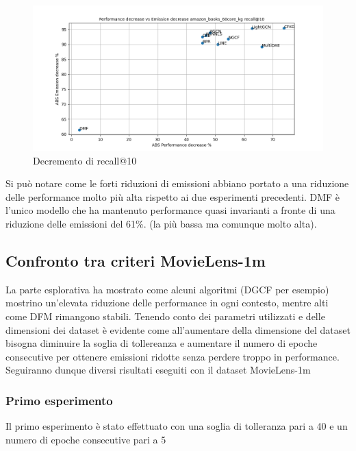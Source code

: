 \begin{figure}[H]
    \centering
    \includegraphics[scale=0.5]{images/decrement_recall@10_amazon_books_60core_kg.png}
    \caption{Decremento di recall@10}
\end{figure}
\noindent Si può notare come le forti riduzioni di emissioni abbiano portato a una riduzione delle performance molto più alta rispetto ai due esperimenti precedenti.
DMF è l'unico modello che ha mantenuto performance quasi invarianti a fronte di una riduzione delle emissioni del 61\%. (la più bassa ma comunque molto alta).
    

\subsection{Confronto tra criteri MovieLens-1m}
La parte esplorativa ha mostrato come alcuni algoritmi (DGCF per esempio) mostrino un'elevata riduzione delle performance in ogni contesto, mentre alti come DFM rimangono stabili.
Tenendo conto dei parametri utilizzati e delle dimensioni dei dataset è evidente come all'aumentare della dimensione del dataset bisogna diminuire la soglia di tollereanza e aumentare il numero di epoche consecutive per ottenere emissioni ridotte senza perdere troppo in performance.
Seguiranno dunque diversi risultati eseguiti con il dataset MovieLens-1m

\subsubsection{Primo esperimento}
Il primo esperimento è stato effettuato con una soglia di tolleranza pari a 40 e un numero di epoche consecutive pari a 5

